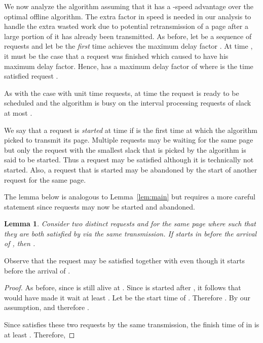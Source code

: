 \documentclass[11pt]{article}
\newtheorem{lemma}{Lemma}[section]
\begin{document}
We now analyze the algorithm assuming that it has a -speed
advantage over the optimal offline algorithm. The extra factor in
speed is needed in our analysis to handle the extra wasted work due to
potential retransmission of a page  after a large portion of it has
already been transmitted.  As before, let  be a sequence of
requests and let  be the \emph{first} time  achieves the
maximum delay factor .  At time , it must be the
case that a request  was finished which caused  to
have his maximum delay factor.  Hence,  has a maximum delay
factor of  where  is
the time  satisfied request .

As with the case with unit time requests, at time  the request  is ready to be
scheduled and the algorithm is busy on the interval  processing requests of slack at most .

We say that a request  is {\em started} at time  if 
is the first time at which the algorithm picked  to
transmit its page. Multiple requests may be waiting for the same page
 but only the request with the smallest slack that is picked by the
algorithm is said to be started. Thus a request may be satisfied
although it is technically not started. Also, a request 
that is started may be abandoned by the start of another request for
the same page.

The lemma below is analogous to Lemma~\ref{lem:main} but requires
a more careful statement since requests may now be started and
abandoned.

\begin{lemma}
  \label{mainvarying} Consider two distinct requests  and
   for the same page  where  such that they are
  both satisfied by  via the same transmission. If  starts
   in  before the arrival of ,
  then  .
\end{lemma}

Observe that the request  may be satisfied together with
 even though it starts before the arrival of .

\begin{proof}
  As before,  since  is
  still alive at . Since  is started after , it
  follows that  would have made it wait at least . Let  be the start time of
  . Therefore . By our assumption,  and therefore
  .

  Since  satisfies these two requests by the same transmission,
  the finish time of  in  is at least .
  Therefore,


\end{proof}
\end{document}
